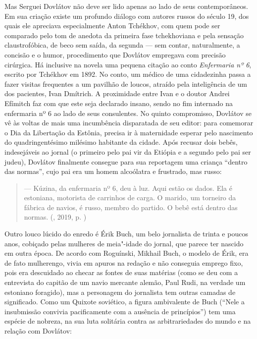 Mas Serguei Dovlátov não deve ser lido apenas ao lado de seus
contemporâneos. Em sua criação existe um profundo diálogo com autores
russos do século 19, dos quais ele apreciava especialmente Anton
Tchékhov, com quem pode ser comparado pelo tom de anedota da primeira
fase tchekhoviana e pela sensação claustrofóbica, de beco sem saída, da
segunda --- sem contar, naturalmente, a concisão e o humor, procedimento
que Dovlátov empregava com precisão cirúrgica. Há inclusive na novela
uma pequena citação ao conto \emph{Enfermaria nº 6}, escrito por
Tchékhov em 1892. No conto, um médico de uma cidadezinha passa a fazer
visitas frequentes a um pavilhão de loucos, atraído pela inteligência de
um dos pacientes, Ivan Dmítrich. A proximidade entre Ivan e o doutor
Andrei Efímitch faz com que este seja declarado insano, sendo no fim
internado na enfermaria nº 6 ao lado de seus consulentes. No quinto
compromisso, Dovlátov se vê às voltas de mais uma incumbência
disparatada de seu editor: para comemorar o Dia da Libertação da
Estônia, precisa ir à maternidade esperar pelo nascimento do
quadringentésimo milésimo habitante da cidade. Após recusar dois bebês,
indesejáveis ao jornal (o primeiro pelo pai vir da Etiópia e a segundo
pelo pai ser judeu), Dovlátov finalmente consegue para sua reportagem
uma criança ``dentro das normas'', cujo pai era um homem alcoólatra e
frustrado, mas russo:

\begin{quote}
--- Kúzina, da enfermaria nº 6, deu à luz. Aqui estão os dados. Ela é
estoniana, motorista de carrinhos de carga. O marido, um torneiro da
fábrica de navios, é russo, membro do partido. O bebê está dentro das
normas. (, 2019, p. \pageref{ref4})
\end{quote}

Outro louco lúcido do enredo é Érik Buch, um belo jornalista de trinta e
poucos anos, cobiçado pelas mulheres de meia"-idade do jornal, que parece
ter nascido em outra época. De acordo com Roguínski, Mikhail Buch, o
modelo de Érik, era de fato mulherengo, vivia em apuros na redação e não
conseguia emprego fixo, pois era descuidado ao checar as fontes de suas
matérias (como se deu com a entrevista do capitão de um navio mercante
alemão, Paul Rudi, na verdade um estoniano foragido), mas a personagem
do jornalista tem outras camadas de significado. Como um Quixote
soviético, a figura ambivalente de Buch (``Nele a insubmissão convivia
pacificamente com a ausência de princípios'') tem uma espécie de
nobreza, na sua luta solitária contra as arbitrariedades do mundo e na
relação com Dovlátov:

